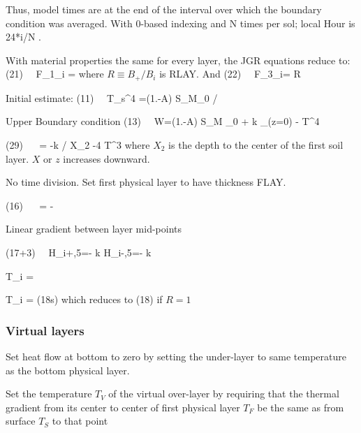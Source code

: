 \documentclass{article}
\begin{document}
Thus, model times are at the end of the interval over which the boundary condition was averaged. With 0-based indexing and N times per sol; local Hour is 24*i/N .

With material properties the same for every layer, the JGR equations reduce to: 
 \qb (21)  \Longrightarrow \ \  F_{1_i} =  \qe
where $R \equiv B_+/B_i$ is RLAY. And 
\qb  (22)  \Longrightarrow \ \ F_{3_i}= 
 \equiv {} \equiv R  \qe

Initial estimate: 
\qb  (11)  \Longrightarrow \ \ \langle T_s^4 \rangle =(1.-A) S_M\langle \mu_0 \rangle / \epsilon \sigma  \qe

Upper Boundary condition
\qb (13)  \Longrightarrow \ \ W=(1.-A) S_M  \mu_0  + k _{(z=0)} - \epsilon\sigma T^4 \label{eq:w} \qe

\qb (29)  \Longrightarrow \ \   = -k / X_2 -4  \epsilon \sigma T^3 \qe 
 where $X_2$ is the depth to the center of the first soil layer. $X$ or $z$ increases downward.

No time division.  Set first physical layer to have thickness FLAY.

\qb (16)  \Longrightarrow \ \  = - \qe

Linear gradient between layer mid-points

\qb (17+3)  \Longrightarrow \ \ H_{i+,5}=- k    H_{i-,5}=- k \qe

\qb \Delta T_i =   \qe 

\qb \Delta T_i = \kappa {} 
  \Longleftrightarrow (18s)\qe
 which reduces to (18) if $R=1$ 

\subsubsection{Virtual layers}
 Set heat flow at bottom to zero by setting the under-layer to same temperature as the bottom physical layer.

Set the temperature $T_V$ of the virtual over-layer by requiring that the thermal gradient from its center to center of first physical layer $T_F$ be the same as from surface $T_S$ to that point
\end{document}
